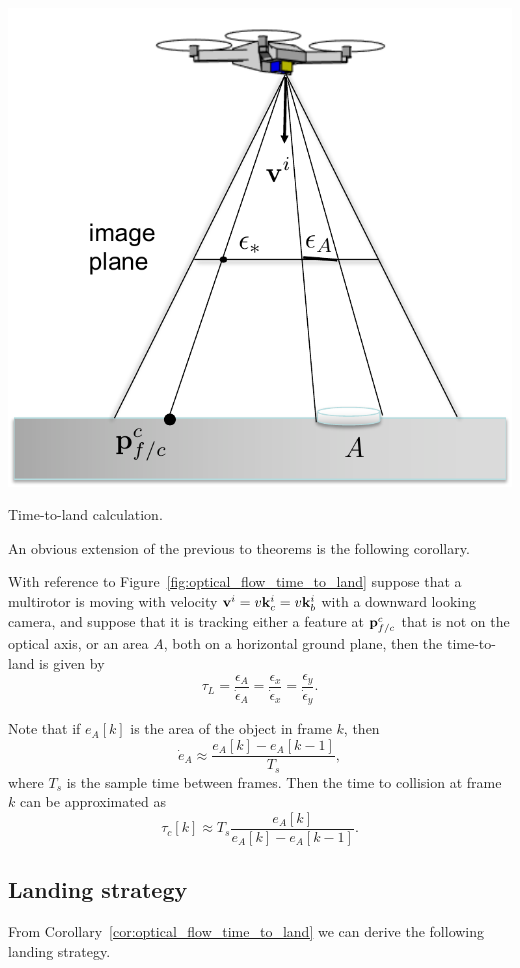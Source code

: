 \begin{marginfigure}
	\includegraphics[width=\linewidth]{chap7_optical_flow/figures/optical_flow_time_to_land}
	\caption{Time-to-land calculation.}
	\label{fig:optical_flow_time_to_land}
\end{marginfigure}  
An obvious extension of the previous to theorems is the following corollary.
\begin{corollary}\label{cor:optical_flow_time_to_land}
	With reference to Figure~\ref{fig:optical_flow_time_to_land} suppose that a multirotor is moving with velocity $\mathbf{v}^i = v\mathbf{k}_c^i=v\mathbf{k}_b^i$ with a downward looking camera, and suppose that it is tracking either a feature at $\mathbf{p}_{f/c}^c$ that is not on the optical axis, or an area $A$, both on a horizontal ground plane, then the time-to-land is given by
	\[
	\tau_L = \frac{\epsilon_A}{\dot{\epsilon}_A} = \frac{\epsilon_x}{\dot{\epsilon}_x} = \frac{\epsilon_y}{\dot{\epsilon}_y}.
	\]
\end{corollary}
Note that if $e_A[k]$ is the area of the object in frame $k$, then 
\[
\dot{e}_A \approx \frac{e_A[k]-e_A[k-1]}{T_s},
\]
where $T_s$ is the sample time between frames.  Then the time to collision at frame $k$ can be approximated as
\[
\tau_c[k] \approx T_s\frac{e_A[k]}{e_A[k]-e_A[k-1]}.
\]


\subsection{Landing strategy}
From Corollary~\ref{cor:optical_flow_time_to_land} we can derive the following landing strategy. 


